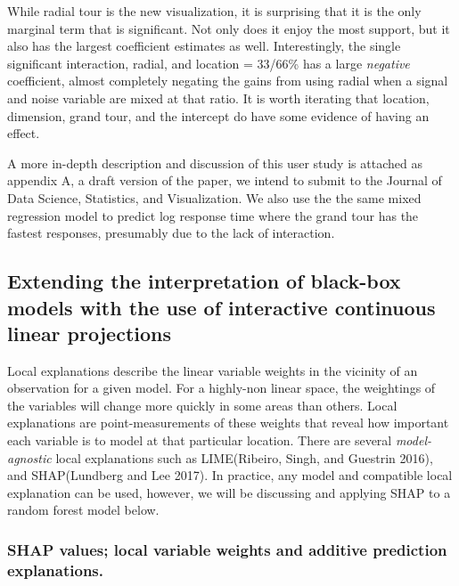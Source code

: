 \documentclass[
  11,
]{article}
\begin{document}
While radial tour is the new visualization, it is surprising that it is the only marginal term that is significant. Not only does it enjoy the most support, but it also has the largest coefficient estimates as well. Interestingly, the single significant interaction, radial, and location = 33/66\% has a large \emph{negative} coefficient, almost completely negating the gains from using radial when a signal and noise variable are mixed at that ratio. It is worth iterating that location, dimension, grand tour, and the intercept do have some evidence of having an effect.

A more in-depth description and discussion of this user study is attached as appendix A, a draft version of the paper, we intend to submit to the Journal of Data Science, Statistics, and Visualization. We also use the the same mixed regression model to predict log response time where the grand tour has the fastest responses, presumably due to the lack of interaction.

\hypertarget{extending-the-interpretation-of-black-box-models-with-the-use-of-interactive-continuous-linear-projections}{%
\subsection{Extending the interpretation of black-box models with the use of interactive continuous linear projections}\label{extending-the-interpretation-of-black-box-models-with-the-use-of-interactive-continuous-linear-projections}}

Local explanations describe the linear variable weights in the vicinity of an observation for a given model. For a highly-non linear space, the weightings of the variables will change more quickly in some areas than others. Local explanations are point-measurements of these weights that reveal how important each variable is to model at that particular location. There are several \emph{model-agnostic} local explanations such as LIME(Ribeiro, Singh, and Guestrin 2016), and SHAP(Lundberg and Lee 2017). In practice, any model and compatible local explanation can be used, however, we will be discussing and applying SHAP to a random forest model below.

\hypertarget{shap-values-local-variable-weights-and-additive-prediction-explanations.}{%
\subsubsection{SHAP values; local variable weights and additive prediction explanations.}\label{shap-values-local-variable-weights-and-additive-prediction-explanations.}}
\end{document}
